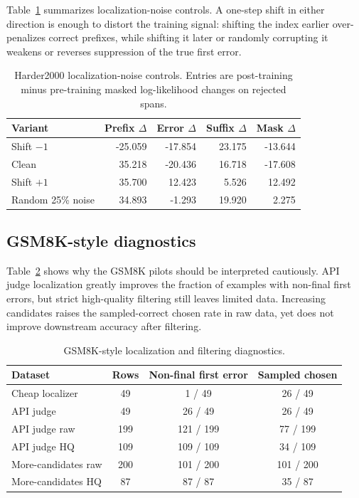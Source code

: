 Table~\ref{tab:localization-noise} summarizes localization-noise controls. A one-step shift in either direction is enough to distort the training signal: shifting the index earlier over-penalizes correct prefixes, while shifting it later or randomly corrupting it weakens or reverses suppression of the true first error.

\begin{table}[h]
\caption{Harder2000 localization-noise controls. Entries are post-training minus pre-training masked log-likelihood changes on rejected spans.}
\label{tab:localization-noise}
\begin{center}
\begin{tabular}{lrrrr}
\toprule
Variant & Prefix $\Delta$ & Error $\Delta$ & Suffix $\Delta$ & Mask $\Delta$ \\
\midrule
Shift $-1$ & -25.059 & -17.854 & 23.175 & -13.644 \\
Clean \cmdpo{} & 35.218 & -20.436 & 16.718 & -17.608 \\
Shift $+1$ & 35.700 & 12.423 & 5.526 & 12.492 \\
Random 25\% noise & 34.893 & -1.293 & 19.920 & 2.275 \\
\bottomrule
\end{tabular}
\end{center}
\end{table}

\subsection{GSM8K-style diagnostics}
\label{app:gsm8k-diagnostics}

Table~\ref{tab:localization} shows why the GSM8K pilots should be interpreted cautiously. API judge localization greatly improves the fraction of examples with non-final first errors, but strict high-quality filtering still leaves limited data. Increasing candidates raises the sampled-correct chosen rate in raw data, yet does not improve downstream accuracy after filtering.

\begin{table}[h]
\caption{GSM8K-style localization and filtering diagnostics.}
\label{tab:localization}
\begin{center}
\begin{tabular}{lccc}
\toprule
Dataset & Rows & Non-final first error & Sampled chosen \\
\midrule
Cheap localizer & 49 & 1 / 49 & 26 / 49 \\
API judge & 49 & 26 / 49 & 26 / 49 \\
API judge raw & 199 & 121 / 199 & 77 / 199 \\
API judge HQ & 109 & 109 / 109 & 34 / 109 \\
More-candidates raw & 200 & 101 / 200 & 101 / 200 \\
More-candidates HQ & 87 & 87 / 87 & 35 / 87 \\
\bottomrule
\end{tabular}
\end{center}
\end{table}

